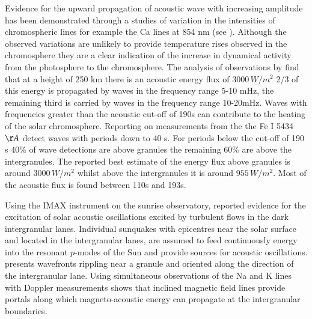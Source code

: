 \documentclass[preprint,authoryear,12pt]{elsarticle}
\begin{document}
Evidence for the upward propagation of acoustic wave with increasing amplitude has been demonstrated through a studies of 
variation in the intensities of chromospheric lines for example the Ca lines at 854 nm (see  \citet{Beck2012}). Although the 
observed variations are unlikely to provide temperature rises observed in the chromosphere they are a clear indication of the increase in dynamical activity from the photosphere to the chromosphere. The analysis of observations by  \citet{Bello2009} find that at a height of 250 km there is an acoustic energy flux of $3000 \,W/m^2$  2/3 of this energy is propagated by waves in the frequency range 5-10 mHz, the remaining third is carried by waves in the frequency range 10-20mHz. Waves with frequencies greater than the acoustic cut-off of 190s can contribute to the heating of the solar chromosphere. Reporting on measurements from the the Fe I 5434 ${\AA}$ \citet{Bello2010A} detect waves with periods down to 40 s. For periods below the cut-off of 190 s 40\% of wave detections are above granules the remaining 60\% are above the intergranules. The reported best estimate of the energy flux above granules is around $3000 \, W/m^2$ whilst above the intergranules it is around $955 \, W/m^2$. Most of the acoustic flux is found between 110s and 193s.

Using the IMAX instrument on the sunrise observatory, \citet{Roth2010}  reported evidence for the excitation of solar acoustic oscillations excited by turbulent flows  in the dark intergranular lanes.  Individual sunquakes with epicentres near the solar surface and located in the intergranular lanes, are assumed to feed continuously energy into the resonant $p$-modes of the Sun and provide sources for acoustic oscillations. \citet{Roth2010} presents wavefronts rippling near a granule and oriented along the direction of the intergranular lane. Using simultaneous observations of the Na and K lines with Doppler measurements  \citet{Jefferies2006} shows that inclined magnetic field lines provide portals along which magneto-acoustic energy can propagate at the intergranular boundaries.
\end{document}
